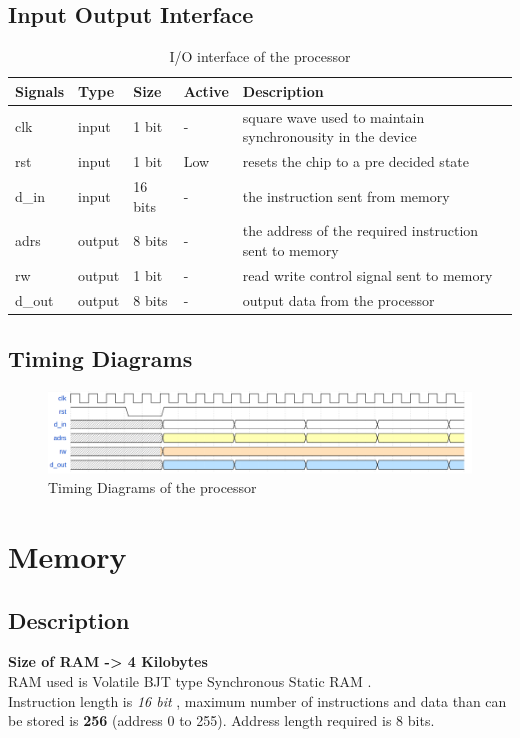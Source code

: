 \documentclass[11pt]{article}
\begin{document}
\subsection{Input Output Interface}
\begin{table}[H]
  \begin{center}
    \caption{I/O interface of the processor}  
    \vspace*{5mm}
    \begin{tabularx}{\linewidth}{||l|l|l||l|X||}
      \hline
          {\bf Signals} & { \bf Type } & {\bf Size} & {\bf Active} &{\bf Description}   \\ \hline
            clk          & input  & 1 bit   & -     &  square wave used to maintain synchronousity in the device \\ \hline
            rst          & input  & 1 bit   & Low   &  resets the chip to a pre decided state \\ \hline
            [15:0] d\_in & input  & 16 bits & -     &  the instruction sent from memory \\ \hline
            [7:0] adrs   & output & 8 bits  & -     &  the address of the required instruction sent to memory \\ \hline
            rw           & output & 1 bit   & -     &  read write control signal sent to memory \\ \hline
            [7:0] d\_out & output & 8 bits  & -     &  output data from the processor \\ \hline
    \end{tabularx}
  \end{center}
\end{table}
\subsection{Timing Diagrams}
\begin{figure}[!h]
  \caption{Timing Diagrams of the processor}
  \includegraphics[scale=0.4]{./images/MergedImages.png}
\end{figure}
\section{Memory}
\subsection{Description}
{\bf Size of RAM -> 4 Kilobytes} \\
RAM used is Volatile BJT type Synchronous Static RAM . \\
Instruction length is \textit{16 bit} , maximum number of instructions  and data than can be stored is {\bf 256} (address 0 to 255).
Address length required is 8 bits.
\end{document}

